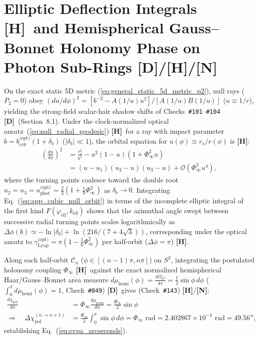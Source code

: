 \documentclass[11pt,a4paper]{article}
\newcommand{\catD}{\textbf{\textcolor{blue!75!black}{[D]}}}
\newcommand{\catH}{\textbf{\textcolor{orange!85!black}{[H]}}}
\newcommand{\catN}{\textbf{\textcolor{teal!75!black}{[N]}}}
\theoremstyle{plain}
\theoremstyle{definition}
\theoremstyle{remark}
\numberwithin{equation}{section}
\begin{document}
\section{\texorpdfstring{Elliptic Deflection Integrals \catH\ and Hemispherical Gauss--Bonnet Holonomy Phase on Photon Sub-Rings \catD/\catH/\catN}{Elliptic Deflection Integrals and Hemispherical Gauss-Bonnet Holonomy Phase on Photon Sub-Rings}}
\label{app:elliptic_subring_holonomy}

On the exact static 5D metric (\ref{eq:general_static_5d_metric_p2}), null rays ($P_2 = 0$) obey $(du/d\phi)^2 = [b^{-2} - A(1/u)u^2]/[A(1/u)B(1/u)]$ ($u \equiv 1/r$), yielding the strong-field scalar-hair shadow shifts of Checks~\texttt{\#101}--\texttt{\#104} \catD\ (Section~8.1). Under the clock-normalized optical ansatz~(\ref{eq:null_radial_geodesic}) \catH\ for a ray with impact parameter $b = b_{\text{crit}}^{\text{(opt)}}(1 + \delta_b)$ ($|\delta_b| \ll 1$), the orbital equation for $u(\phi) \equiv r_s / r(\phi)$ is \catH:
\begin{align}
\left(\frac{du}{d\phi}\right)^2 &= \frac{r_s^2}{b^2} - u^2\left(1 - u\right)\left(1 + \Phi_{\infty}^2 u\right) \nonumber \\[3pt]
&= \left(u - u_1\right)\left(u_2 - u\right)\left(u_3 - u\right) + \mathcal{O}\left(\Phi_{\infty}^2 u^4\right),
\label{eq:app_cubic_null_orbit}
\end{align}
where the turning points coalesce toward the double root $u_2 = u_3 = u_{\text{phot}}^{\text{(opt)}} = \frac{2}{3}(1 + \frac{1}{9}\Phi_{\infty}^2)$ as $\delta_b \to 0$. Integrating Eq.~(\ref{eq:app_cubic_null_orbit}) in terms of the incomplete elliptic integral of the first kind $F(\varphi_{\text{ell}}, k_{\text{ell}})$ shows that the azimuthal angle swept between successive radial turning points scales logarithmically as $\Delta\phi(b) \simeq -\ln|\delta_b| + \ln(216 / (7 + 4\sqrt{3}))$, corresponding under the optical ansatz to $\gamma_{\text{Lyap}}^{\text{(opt)}} = \pi\left(1 - \frac{1}{6}\Phi_{\infty}^2\right)$ per half-orbit ($\Delta\phi = \pi$) \catH.

Along each half-orbit $\mathcal{C}_n$ ($\phi \in [(n-1)\pi, n\pi]$) on $S^2$, integrating the postulated holonomy coupling $\Phi_{\infty}$ \catH\ against the exact normalized hemispherical Haar/Gauss--Bonnet area measure $d\mu_{\text{hemi}}(\phi) = \frac{d\Omega_{S^2}}{4\pi} = \frac{1}{2}\sin\phi\,d\phi$ ($\int_0^{\pi} d\mu_{\text{hemi}}(\phi) = 1$, Check~\texttt{\#049}) \catD\ gives (Check~\texttt{\#143}) \catH/\catN:
\begin{align}
\frac{d\chi_{\text{pol}}}{d\phi} &= \Phi_{\infty}\frac{d\mu_{\text{hemi}}}{d\phi} = \frac{\Phi_{\infty}}{2}\sin\phi \nonumber \\[3pt]
\Longrightarrow \quad \Delta\chi_{\text{pol}}^{(n \to n+1)} &= \frac{\Phi_{\infty}}{2} \int_0^\pi \sin\phi\,d\phi = \Phi_{\infty}\text{ rad} = 2.402867 \times 10^{-4}\text{ rad} = \mathbf{49.56''},
\label{eq:app_holonomy_integral}
\end{align}
establishing Eq.~(\ref{eq:evpa_arcseconds}).
\end{document}
